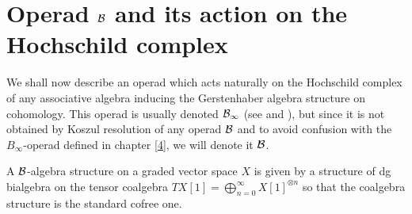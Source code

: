 \documentclass[TFM.tex]{subfiles}
\begin{document}


\section{Operad $\mathcal{B}$ and its action on the Hochschild complex}
We shall now describe an operad which acts naturally on the Hochschild complex of any associative algebra inducing the Gerstenhaber algebra structure on cohomology. This operad is
usually denoted $\mathcal{B}_\infty$ (see \cite{Hinich} and \cite{VO}), but since it is not obtained by Koszul resolution of any operad $\mathcal{B}$ and to avoid confusion with the $B_\infty$-operad defined in chapter \ref{4}, we will denote it $\mathcal{B}$. 

\begin{defi}
A $\mathcal{B}$-algebra structure on a graded vector space $X$ is given by a structure of dg bialgebra on the tensor coalgebra $TX[1]=\bigoplus_{n=0}^\infty X[1]^{\otimes n}$ so that the coalgebra structure is the standard cofree one.
\end{defi}
\end{document}

